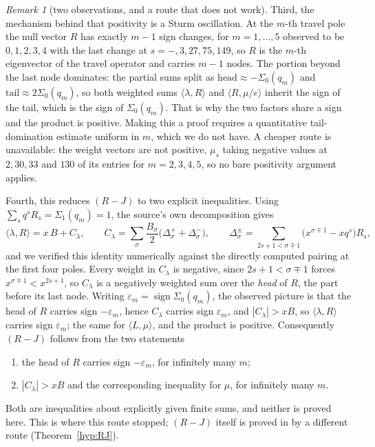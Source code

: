 \documentclass[11pt]{article}
\theoremstyle{definition}
\theoremstyle{remark}
\newtheorem{remark}[theorem]{Remark}
\theoremstyle{definition}
\begin{document}
\begin{remark}[two observations, and a route that does not work]
Third, the mechanism behind that positivity is a Sturm oscillation. At the $m$-th travel pole the
null vector $R$ has exactly $m-1$ sign changes, for $m=1,\dots,5$ observed to be
$0,1,2,3,4$ with the last change at $s=-,3,27,75,149$, so $R$ is the $m$-th eigenvector of the
travel operator and carries $m-1$ nodes. The portion beyond the last node dominates: the partial
sums split as $\text{head}\approx-\Sigma_0(q_m)$ and $\text{tail}\approx2\Sigma_0(q_m)$, so both
weighted sums $\langle\lambda,R\rangle$ and $\langle R,\mu/e\rangle$ inherit the sign of the tail,
which is the sign of $\Sigma_0(q_m)$. That is why the two factors share a sign and the product is
positive. Making this a proof requires a quantitative tail-domination estimate uniform in $m$,
which we do not have. A cheaper route is unavailable: the weight vectors are not positive, $\mu_s$
taking negative values at $2,30,33$ and $130$ of its entries for $m=2,3,4,5$, so no bare
positivity argument applies.

Fourth, this reduces $(R\!-\!J)$ to two explicit inequalities. Using
$\sum_sq^sR_s=\Sigma_1(q_m)=1$, the source's own decomposition gives
\[
   \langle\lambda,R\rangle=x\,B+C_\lambda,\qquad
   C_\lambda=\sum_{\sigma}\frac{B_\sigma}{2}\bigl(\Delta^+_\sigma+\Delta^-_\sigma\bigr),\qquad
   \Delta^\pm_\sigma=\!\!\sum_{2s+1<\sigma\mp1}\!\!\bigl(x^{\sigma\mp1}-xq^s\bigr)R_s ,
\]
and we verified this identity numerically against the directly computed pairing at the first four
poles. Every weight in $C_\lambda$ is negative, since $2s+1<\sigma\mp1$ forces
$x^{\sigma\mp1}<x^{2s+1}$, so $C_\lambda$ is a negatively weighted sum over the \emph{head} of
$R$, the part before its last node. Writing $\varepsilon_m=\operatorname{sign}\Sigma_0(q_m)$, the
observed picture is that the head of $R$ carries sign $-\varepsilon_m$, hence $C_\lambda$ carries
sign $\varepsilon_m$, and $|C_\lambda|>xB$, so $\langle\lambda,R\rangle$ carries sign
$\varepsilon_m$; the same for $\langle L,\mu\rangle$, and the product is positive. Consequently
$(R\!-\!J)$ follows from the two statements
\begin{enumerate}[label=\textup{(S\arabic*)},leftmargin=2.6em]
\item the head of $R$ carries sign $-\varepsilon_m$, for infinitely many $m$;
\item $|C_\lambda|>xB$ and the corresponding inequality for $\mu$, for infinitely many $m$.
\end{enumerate}
Both are inequalities about explicitly given finite sums, and neither is proved here. This is
where this route stopped; $(R\!-\!J)$ itself is proved in \cite{paper2} by a different route
(Theorem~\ref{hyp:RJ}).


\end{remark}
\end{document}
